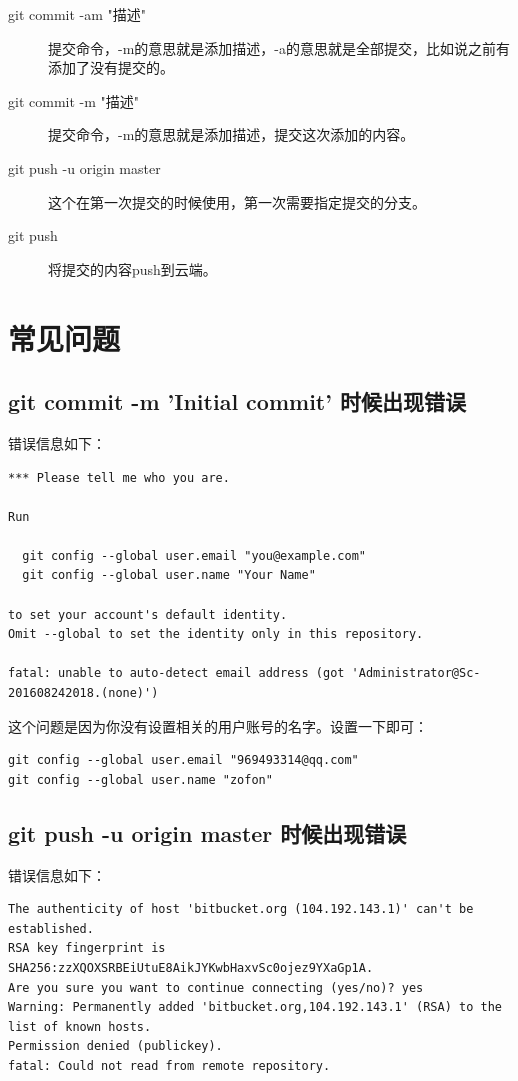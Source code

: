 \documentclass[a4paper,12pt]{ctexbook}
\begin{document}
\begin{flushleft}
\begin{description}
  \item[git commit -am "描述"] 提交命令，-m的意思就是添加描述，-a的意思就是全部提交，比如说之前有添加了没有提交的。
  \item[git commit -m  "描述"] 提交命令，-m的意思就是添加描述，提交这次添加的内容。

  \item[git push -u origin master] 这个在第一次提交的时候使用，第一次需要指定提交的分支。
  \item[git push] 将提交的内容push到云端。
\end{description}

\chapter{常见问题}
\section{git commit -m 'Initial commit' 时候出现错误}
错误信息如下：
\begin{verbatim}
*** Please tell me who you are.

Run

  git config --global user.email "you@example.com"
  git config --global user.name "Your Name"

to set your account's default identity.
Omit --global to set the identity only in this repository.

fatal: unable to auto-detect email address (got 'Administrator@Sc-201608242018.(none)')
\end{verbatim}
这个问题是因为你没有设置相关的用户账号的名字。设置一下即可：
\begin{verbatim}
git config --global user.email "969493314@qq.com"
git config --global user.name "zofon"
\end{verbatim}

\section{git push -u origin master 时候出现错误}
错误信息如下：
\begin{verbatim}
The authenticity of host 'bitbucket.org (104.192.143.1)' can't be established.
RSA key fingerprint is SHA256:zzXQOXSRBEiUtuE8AikJYKwbHaxvSc0ojez9YXaGp1A.
Are you sure you want to continue connecting (yes/no)? yes
Warning: Permanently added 'bitbucket.org,104.192.143.1' (RSA) to the list of known hosts.
Permission denied (publickey).
fatal: Could not read from remote repository.


\end{verbatim}
\end{flushleft}
\end{document}
